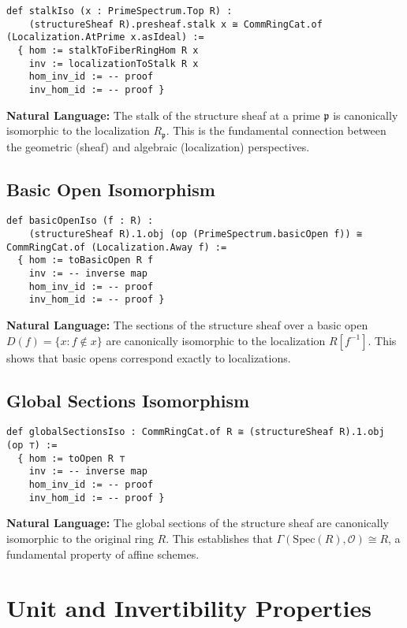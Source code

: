 \documentclass{article}
\theoremstyle{definition}
\begin{document}
\begin{lstlisting}
def stalkIso (x : PrimeSpectrum.Top R) :
    (structureSheaf R).presheaf.stalk x ≅ CommRingCat.of (Localization.AtPrime x.asIdeal) :=
  { hom := stalkToFiberRingHom R x
    inv := localizationToStalk R x
    hom_inv_id := -- proof
    inv_hom_id := -- proof }
\end{lstlisting}

\textbf{Natural Language:} The stalk of the structure sheaf at a prime $\mathfrak{p}$ is canonically isomorphic to the localization $R_\mathfrak{p}$. This is the fundamental connection between the geometric (sheaf) and algebraic (localization) perspectives.

\subsection{Basic Open Isomorphism}

\begin{lstlisting}
def basicOpenIso (f : R) :
    (structureSheaf R).1.obj (op (PrimeSpectrum.basicOpen f)) ≅ CommRingCat.of (Localization.Away f) :=
  { hom := toBasicOpen R f
    inv := -- inverse map
    hom_inv_id := -- proof
    inv_hom_id := -- proof }
\end{lstlisting}

\textbf{Natural Language:} The sections of the structure sheaf over a basic open $D(f) = \{x : f \notin x\}$ are canonically isomorphic to the localization $R[f^{-1}]$. This shows that basic opens correspond exactly to localizations.

\subsection{Global Sections Isomorphism}

\begin{lstlisting}
def globalSectionsIso : CommRingCat.of R ≅ (structureSheaf R).1.obj (op ⊤) :=
  { hom := toOpen R ⊤
    inv := -- inverse map
    hom_inv_id := -- proof
    inv_hom_id := -- proof }
\end{lstlisting}

\textbf{Natural Language:} The global sections of the structure sheaf are canonically isomorphic to the original ring $R$. This establishes that $\Gamma(\mathrm{Spec}(R), \mathcal{O}) \cong R$, a fundamental property of affine schemes.

\section{Unit and Invertibility Properties}
\end{document}
